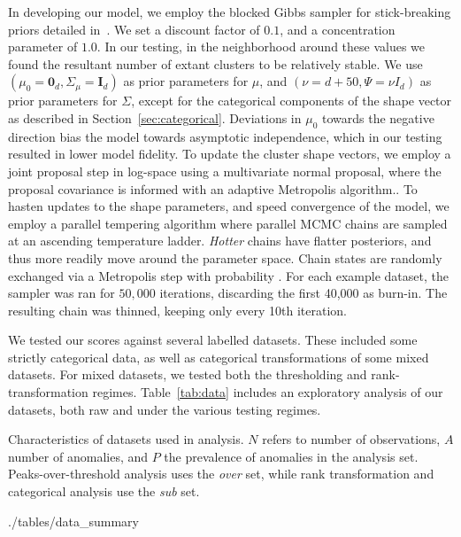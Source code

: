 In developing our model, we employ the blocked Gibbs sampler for stick-breaking
    priors detailed in~\cite{ishwaran2001}.  We set a discount factor of $0.1$, 
    and a concentration parameter of $1.0$.  In our testing, in the neighborhood
    around these values we found the resultant number of extant clusters to be 
    relatively stable.  We use $(\mu_0 = \bm{0}_d,\Sigma_{\mu} = \bm{I}_d)$ as 
    prior parameters for $\mu$, and $(\nu = d + 50,\Psi = \nu I_d)$ as prior 
    parameters for $\Sigma$, except for the categorical components of the shape 
    vector as described in Section~\ref{sec:categorical}.  Deviations in $\mu_0$ 
    towards the negative direction bias the model towards asymptotic 
    independence, which in our testing resulted in lower model fidelity.
    To update the cluster shape vectors, we employ a joint proposal step in 
    log-space using a multivariate normal proposal, where the proposal 
    covariance is informed with an adaptive Metropolis 
    algorithm..  To hasten updates to the shape
    parameters, and speed convergence of the model, we employ a parallel
    tempering algorithm where parallel MCMC chains are sampled at an ascending
    temperature ladder.  \emph{Hotter} chains have flatter posteriors, and thus 
    more readily move around the parameter space.  Chain states are randomly 
    exchanged via a Metropolis step
    with probability .
    For each example dataset, the sampler was ran for $50,000$ iterations,
    discarding the first 40,000 as burn-in.  The resulting chain was thinned,
    keeping only every 10th iteration.

We tested our scores against several labelled datasets.  These included some 
    strictly categorical data, as well as categorical transformations of some 
    mixed datasets.  For mixed datasets, we tested both the thresholding and 
    rank-transformation regimes. Table~\ref{tab:data} includes an exploratory 
    analysis of our datasets, both raw and under the various testing regimes.

\begin{table}[t]
    \centering
    \caption{Characteristics of datasets used in analysis.  $N$ refers to 
    number of observations, $A$ number of anomalies, and $P$ the prevalence of 
    anomalies in the analysis set.  Peaks-over-threshold analysis uses the 
    \emph{over} set, while rank transformation and categorical analysis use 
    the \emph{sub} set.\label{tab:data}}
    \bigskip
     {./tables/data_summary}
\end{table}

